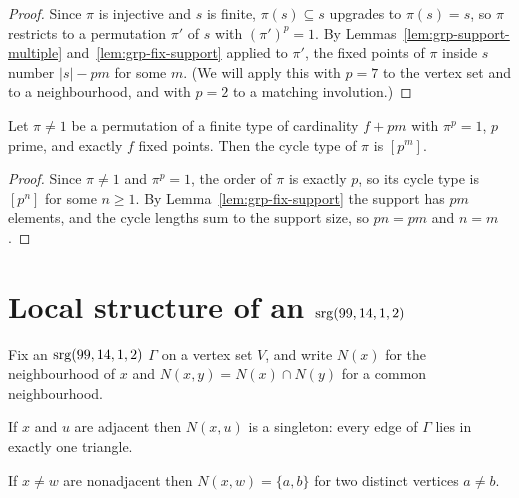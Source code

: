 \begin{proof}\leanok
{}
Since $\pi$ is injective and $s$ is finite, $\pi(s) \subseteq s$ upgrades to
$\pi(s) = s$, so $\pi$ restricts to a permutation $\pi'$ of $s$ with
$(\pi')^p = 1$.  By Lemmas~\ref{lem:grp-support-multiple}
and~\ref{lem:grp-fix-support} applied to $\pi'$, the fixed points of $\pi$
inside $s$ number $|s| - pm$ for some $m$.  (We will apply this with $p = 7$
to the vertex set and to a neighbourhood, and with $p = 2$ to a matching
involution.)
\end{proof}

\begin{proposition}\label{lem:grp-cycletype-of-fixed}
Let $\pi \ne 1$ be a permutation of a finite type of cardinality $f + pm$ with
$\pi^p = 1$, $p$ prime, and exactly $f$ fixed points.  Then the cycle type of
$\pi$ is $[p^m]$.
\leanok
\end{proposition}

\begin{proof}\leanok
{}
Since $\pi \ne 1$ and $\pi^p = 1$, the order of $\pi$ is exactly $p$, so its
cycle type is $[p^n]$ for some $n \ge 1$.  By
Lemma~\ref{lem:grp-fix-support} the support has $pm$ elements, and the cycle
lengths sum to the support size, so $pn = pm$ and $n = m$.
\end{proof}

\section{Local structure of an \texorpdfstring{$\mathrm{srg}(99,14,1,2)$}{srg(99,14,1,2)}}

Fix an $\mathrm{srg}(99,14,1,2)$ $\Gamma$ on a vertex set $V$, and write
$N(x)$ for the neighbourhood of $x$ and $N(x,y) = N(x) \cap N(y)$ for a
common neighbourhood.

\begin{lemma}[$\lambda = 1$: unique triangles]\label{lem:grp-unique-triangle}
If $x$ and $u$ are adjacent then $N(x,u)$ is a singleton: every edge of
$\Gamma$ lies in exactly one triangle.
\leanok
{}
\end{lemma}

\begin{lemma}[$\mu = 2$: common-neighbour pairs]\label{lem:grp-mu-pair}
If $x \ne w$ are nonadjacent then $N(x,w) = \{a,b\}$ for two distinct
vertices $a \ne b$.
\leanok
{}
\end{lemma}

